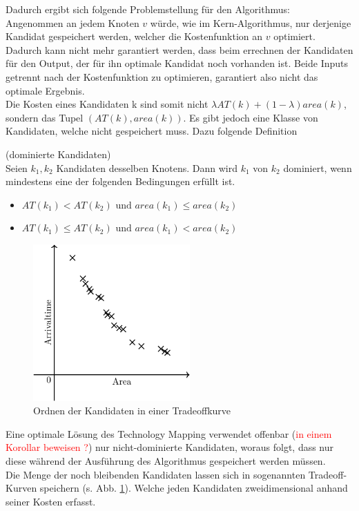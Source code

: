 \documentclass[11pt, a4paper, german]{article}
\newcommand{\TM}{Technology Mapping }
\begin{document}
Dadurch ergibt sich folgende Problemstellung für den Algorithmus: \\
Angenommen an jedem Knoten $v$ würde, wie im Kern-Algorithmus, nur derjenige Kandidat gespeichert werden, welcher die Kostenfunktion an $v$ optimiert. Dadurch kann nicht mehr garantiert werden, dass beim errechnen der Kandidaten für den Output, der für ihn optimale Kandidat noch vorhanden ist. Beide Inputs getrennt nach der Kostenfunktion zu optimieren, garantiert also nicht das optimale Ergebnis.\\

Die Kosten eines Kandidaten k sind somit nicht $\lambda AT(k) +(1-\lambda )area(k)$,  sondern das Tupel $(AT(k), area(k))$.
Es gibt jedoch eine Klasse von Kandidaten, welche nicht gespeichert muss. Dazu folgende Definition\\

\begin{definition}{(dominierte Kandidaten)}\\
	Seien $k_1, k_2$ Kandidaten desselben Knotens. Dann wird $k_1$ von $k_2$ dominiert, wenn mindestens eine der folgenden Bedingungen erfüllt ist.
	\begin{itemize}
	\item $AT(k_1) < AT(k_2) \text { und  }area(k_1) \leq area(k_2)$
	\item $	AT(k_1) \leq AT(k_2) \text{ und } area(k_1) < area(k_2)$	
	\end{itemize}
\end{definition}

 \begin{figure}
		\includegraphics[width = 6cm]{pictures/compiled/tradeoff_kurve}
		\caption{Ordnen der Kandidaten in einer Tradeoffkurve}
		\label{bild:tradeoff_kurve}
\end{figure}
Eine optimale Lösung des \TM verwendet offenbar (\textcolor{red}{in einem Korollar beweisen ?}) nur nicht-dominierte Kandidaten, woraus folgt, dass nur diese während der Ausführung des Algorithmus gespeichert werden müssen.\\
Die Menge der noch bleibenden Kandidaten lassen sich in sogenannten Tradeoff-Kurven speichern (s. Abb. \ref{bild:tradeoff_kurve}). Welche jeden Kandidaten zweidimensional anhand seiner Kosten erfasst.\\
\end{document}
